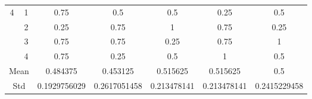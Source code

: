 \documentclass[draft,dvipsnames]{drexel-thesis}
\begin{document}
\begin{thesis}
\begin{table}[!t]
\begin{tabular}{|c|c|c|c|c|c|c|}
\multirow{4}{*}{4}    & 1                   & 0.75         & 0.5          & 0.5         & 0.25        & 0.5          \\ \cline{2-7}
                      & 2                   & 0.25         & 0.75         & 1           & 0.75        & 0.25         \\ \cline{2-7}
                      & 3                   & 0.75         & 0.75         & 0.25        & 0.75        & 1            \\ \cline{2-7}
                      & 4                   & 0.75         & 0.25         & 0.5         & 1           & 0.5          \\ \hline
\multicolumn{2}{|c|}{Mean}                  & 0.484375     & 0.453125     & 0.515625    & 0.515625    & 0.5          \\ \hline
\multicolumn{2}{|c|}{Std}                   & 0.1929756029 & 0.2617051458 & 0.213478141 & 0.213478141 & 0.2415229458 \\ \hline
\end{tabular}
\end{table}


\end{thesis}
\end{document}
